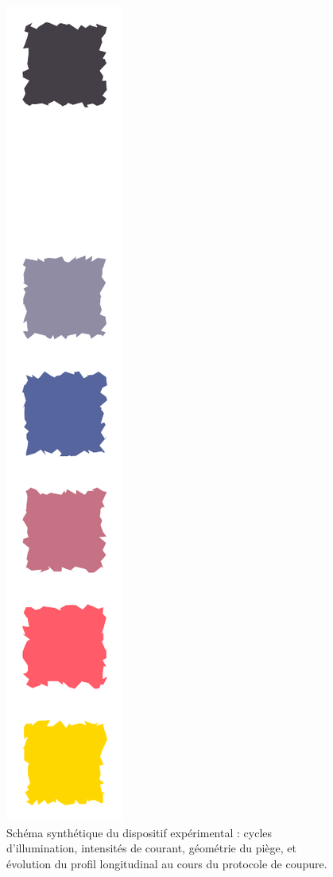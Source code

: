 


\begin{figure}[!htb]
\centering
\includegraphics[width=0.5\linewidth , page = 2 ]{BiPart/Figures/Shemas_2.pdf}
\caption{Schéma synthétique du dispositif expérimental : cycles d’illumination, intensités de courant, géométrie du piège, et évolution du profil longitudinal au cours du protocole de coupure.}
\label{fig:setup}
\end{figure}

